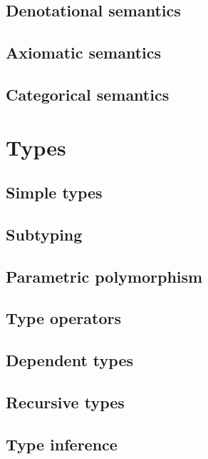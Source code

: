 \documentclass[oneside]{book}
\begin{document}
    \chapter{Denotational semantics}

    \chapter{Axiomatic semantics}

    \chapter{Categorical semantics}

  \part{Types}

    \chapter{Simple types}

    \chapter{Subtyping}

    \chapter{Parametric polymorphism}

    \chapter{Type operators}

    \chapter{Dependent types}

    \chapter{Recursive types}

    \chapter{Type inference}

  \backmatter

  \printbibliography[heading=bibintoc,title=References]

  \printindex
\end{document}
